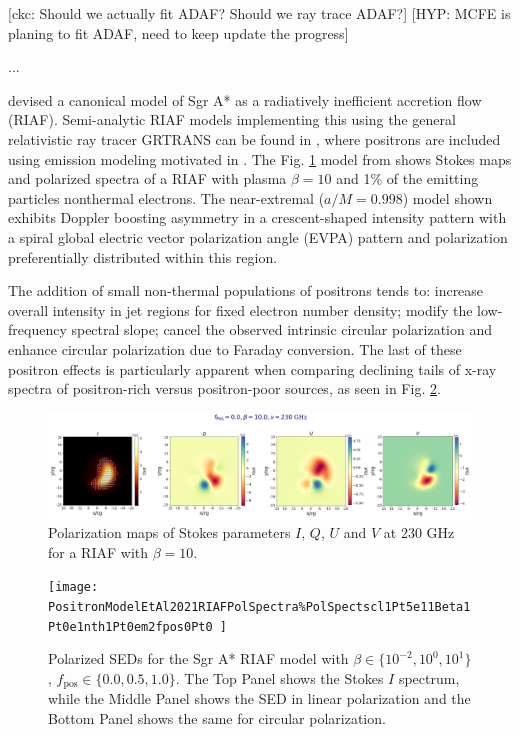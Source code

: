 \documentclass[twocolumn,tighten,dvipsnames,linenumbers]{aastex63}
\newcommand\ckc[1]{{\color{MidnightBlue}[ckc: #1]}}
\newcommand\hyp[1]{{\color{Salmon}[HYP: #1]}}
\begin{document}
\ckc{Should we actually fit ADAF?
  Should we ray trace ADAF?}
\hyp{MCFE is planing to fit ADAF, need to keep update the progress}

...

\cite{Broderick2005} devised a canonical model of Sgr A* as a  radiatively inefficient accretion flow (RIAF). Semi-analytic RIAF models implementing  this using the general relativistic ray tracer GRTRANS \citep{2016MNRAS.462..115D} can be found in  \cite{Emami2021}, where  positrons are included using emission modeling motivated in  \cite{Anantua:2019bna}. The Fig. \ref{fig:EmamiRIAF} model from \cite{Emami2021}  shows Stokes maps and polarized spectra of a \cite{Broderick2005} RIAF with plasma $\beta=10$ and 1$\%$ of the emitting particles nonthermal electrons. The near-extremal ($a/M=0.998$) model shown exhibits Doppler boosting asymmetry in a crescent-shaped intensity pattern with a spiral global electric vector polarization angle (EVPA) pattern and polarization preferentially distributed within this region.


The addition of small non-thermal populations of positrons \citep{Anantua:2019bna,Emami2021} tends to: increase overall intensity in jet regions for fixed electron number density; modify the low-frequency spectral slope; cancel the observed intrinsic circular polarization and enhance circular polarization due to Faraday conversion. The last of these positron effects is particularly apparent when comparing declining tails of x-ray spectra of positron-rich versus positron-poor sources, as seen in Fig. \ref{fig:EmamiRIAFSpectra}.

\begin{figure}%
\includegraphics[width=.5\textwidth,height=27mm%
]{RIAFSgrAPlaneTscl1Pt5e11beta1Pt0e01fpos0Pt0fNTH1Pt0e-02copy}
  \caption{Polarization maps of Stokes parameters $I$, $Q$, $U$ and $V$ at 230 GHz for a \cite{Broderick2005} RIAF with $\beta=10$.}
  \label{fig:EmamiRIAF}
\end{figure}

\begin{figure}%
  \texttt{[image: PositronModelEtAl2021RIAFPolSpectra\%PolSpectscl1Pt5e11Beta1Pt0e1nth1Pt0em2fpos0Pt0
]}
  \caption{Polarized SEDs for the Sgr A* RIAF model with  $\beta\in\{10^{-2},10^{0},10^{1}\}$, $f_\mathrm{pos}\in\{0.0,0.5,1.0\}$. The Top Panel shows the Stokes $I$ spectrum, while the Middle Panel shows the SED in linear polarization and the Bottom Panel shows the same for circular polarization.}
  \label{fig:EmamiRIAFSpectra}
\end{figure}
\end{document}
